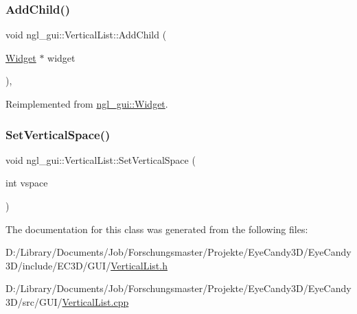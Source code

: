 \subsubsection{\texorpdfstring{Add\+Child()}{AddChild()}}
{\footnotesize\ttfamily void ngl\+\_\+gui\+::\+Vertical\+List\+::\+Add\+Child (\begin{DoxyParamCaption}\item[{\mbox{\hyperlink{classngl__gui_1_1_widget}{Widget}} $\ast$}]{widget }\end{DoxyParamCaption})\hspace{0.3cm}{\ttfamily [override]}, {\ttfamily [virtual]}}



Reimplemented from \mbox{\hyperlink{classngl__gui_1_1_widget_a37128e55931fa4fe2f99556d4a45607a}{ngl\+\_\+gui\+::\+Widget}}.

\mbox{\label{classngl__gui_1_1_vertical_list_a9cd01a452579837c61a5ebb49df7e612}} 
\subsubsection{\texorpdfstring{Set\+Vertical\+Space()}{SetVerticalSpace()}}
{\footnotesize\ttfamily void ngl\+\_\+gui\+::\+Vertical\+List\+::\+Set\+Vertical\+Space (\begin{DoxyParamCaption}\item[{int}]{vspace }\end{DoxyParamCaption})}



The documentation for this class was generated from the following files\+:\begin{DoxyCompactItemize}
\item 
D\+:/\+Library/\+Documents/\+Job/\+Forschungsmaster/\+Projekte/\+Eye\+Candy3\+D/\+Eye\+Candy3\+D/include/\+E\+C3\+D/\+G\+U\+I/\mbox{\hyperlink{_vertical_list_8h}{Vertical\+List.\+h}}\item 
D\+:/\+Library/\+Documents/\+Job/\+Forschungsmaster/\+Projekte/\+Eye\+Candy3\+D/\+Eye\+Candy3\+D/src/\+G\+U\+I/\mbox{\hyperlink{_vertical_list_8cpp}{Vertical\+List.\+cpp}}\end{DoxyCompactItemize}
